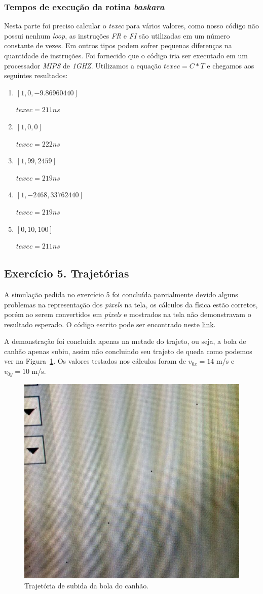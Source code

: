 \documentclass[12pt]{article}
\begin{document}
\subsubsection{Tempos de execução da rotina \textit{baskara}}
\label{subsubsec:4.4}

Nesta parte foi preciso calcular o \textit{texec} para vários valores, como nosso código não possui nenhum \textit{loop}, as instruções \textit{FR} e \textit{FI} são utilizadas em um número constante de vezes. Em outros tipos podem sofrer pequenas diferenças na quantidade de instruções. Foi fornecido que o código iria ser executado em um processador \textit{MIPS} de \textit{1GHZ}. Utilizamos a equação \(texec= C * T\) e chegamos aos seguintes resultados:

\begin{enumerate}
\item \([1, 0, -9.86960440]\)

	\(texec = 211 ns\)
\item \([1, 0, 0]\)

	\(texec = 222 ns\)
\item \([1, 99, 2459]\)

	\(texec = 219 ns\)

\item \([1, -2468, 33762440]\)

	\(texec = 219 ns\)
\item \([0, 10, 100]\)

	\(texec = 211 ns\)
\end{enumerate}

\subsection{Exercício 5. Trajetórias}

A simulação pedida no exercício 5 foi concluída parcialmente devido alguns problemas na representação dos \textit{pixels} na tela, os cálculos da física estão corretos, porém ao serem convertidos em \textit{pixels} e mostrados na tela não demonstravam o resultado esperado. O código escrito pode ser encontrado neste \href{https://github.com/Dayof/OAC172/blob/master/Lab1/ex5/lancamento.asm}{link}.

A demonstração foi concluída apenas na metade do trajeto, ou seja, a bola de canhão apenas subiu, assim não concluindo seu trajeto de queda como podemos ver na Figura~\ref{fig:traj}. Os valores testados nos cálculos foram de $v_{0x} = 14$ m/s e $v_{0y} = 10$ m/s.

\begin{figure}[H]
	\centering
	\includegraphics[width=.6\textwidth]{5.jpg}
	\caption{Trajetória de subida da bola do canhão.}
	\label{fig:traj}
\end{figure}



\end{document}
